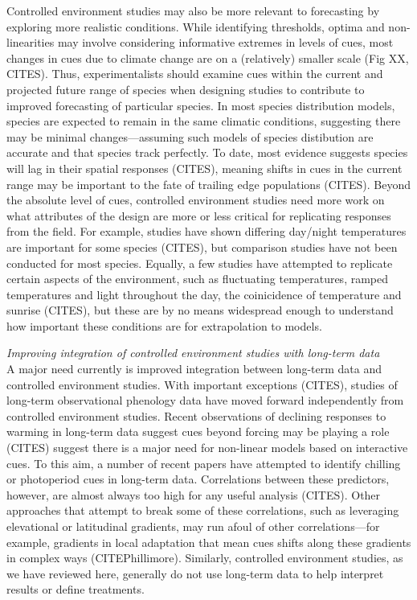 \documentclass[11pt,letter]{article}
\begin{document}
Controlled environment studies may also be more relevant to forecasting by exploring more realistic conditions. While identifying thresholds, optima and non-linearities may involve considering informative extremes in levels of cues, most changes in cues due to climate change are on a (relatively) smaller scale (Fig XX, CITES). Thus, experimentalists should examine cues within the current and projected future range of species when designing studies to contribute to improved forecasting of particular species. In most species distribution models, species are expected to remain in the same climatic conditions, suggesting there may be minimal changes---assuming such models of species distibution are accurate and that species track perfectly. To date, most evidence suggests species will lag in their spatial responses (CITES), meaning shifts in cues in the current range may be important to the fate of trailing edge populations (CITES). Beyond the absolute level of cues, controlled environment studies need more work on what attributes of the design are more or less critical for replicating responses from the field. For example, studies have shown differing day/night temperatures are important for some species (CITES), but comparison studies have not been conducted for most species. Equally, a few studies have attempted to replicate certain aspects of the environment, such as fluctuating temperatures, ramped temperatures and light throughout the day, the coinicidence of temperature and sunrise (CITES), but these are by no means widespread enough to understand how important these conditions are for extrapolation to models. 

\emph{Improving integration of controlled environment studies with long-term data}\\
A major need currently is improved integration between long-term data and controlled environment studies. With important exceptions (CITES), studies of long-term observational phenology data have moved forward independently from controlled environment studies. Recent observations of declining responses to warming in long-term data suggest cues beyond forcing may be playing a role (CITES) suggest there is a major need for non-linear models based on interactive cues. To this aim, a number of recent papers have attempted to identify chilling or photoperiod cues in long-term data. Correlations between these predictors, however, are almost always too high for any useful analysis (CITES). Other approaches that attempt to break some of these correlations, such as leveraging elevational or latitudinal gradients, may run afoul of other correlations---for example, gradients in local adaptation that mean cues shifts along these gradients in complex ways (CITEPhillimore). Similarly, controlled environment studies, as we have reviewed here, generally do not use long-term data to help interpret results or define treatments. 
\end{document}
